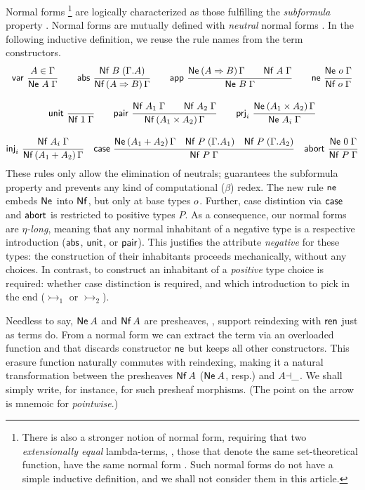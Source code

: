 \documentclass[a4paper,USenglish,cleveref, autoref]{lipics-v2019}
\begin{document}
Normal forms%
\footnote{%
There is also a stronger
notion of normal form, requiring that two \emph{extensionally equal}
lambda-terms, \ie, those that denote the
same set-theoretical function, have the same normal form
\cite{mitchell:foundations,altenkirchDybjerHofmannScott:lics01,scherer:popl17}.
Such normal forms do not have a simple inductive definition, and we
shall not consider them in this article.
}
are logically characterized as those fulfilling the
\emph{subformula} property \cite{prawitz:natded,matthes:shortproofs}.
Normal forms  are mutually defined with
\emph{neutral} normal forms .
In the following inductive definition, we reuse the rule names from the
term constructors.
\begin{gather*}
  \nru{\tvar}{A \in \Gamma}{\Ne A \Gamma}
\qquad
  \nru{\tabs}{\NfC B {\cext \Gamma A}}{\NfP {A \To B} \Gamma}
\qquad
  \nru{\tapp}
    {\NeP {A \To B} \Gamma \qquad \Nf A \Gamma}
    {\Ne B \Gamma}
\qquad
  \nru{\tne}{\Ne \tybase \Gamma}{\Nf \tybase \Gamma}
\\[2ex]
  \nru{\tunit}{}{\Nf \tyone \Gamma}
\qquad
  \nru{\tpair}
    {\Nf {A_1} \Gamma \qquad \Nf {A_2} \Gamma}
    {\NfP {A_1 \times A_2} \Gamma}
\qquad
  \nru{\tprj_i}
    {\NeP {A_1 \times A_2} \Gamma}
    {\Ne {A_i} \Gamma}
\\[2ex]
  \nru{\tinj_i}
    {\Nf {A_i} \Gamma}
    {\NfP {A_1 + A_2} \Gamma}
\quad
  \nru{\tcase}
    {\NeP {A_1 + A_2} \Gamma
      \quad \NfC P {\cext \Gamma A_1}
      \quad \NfC P {\cext \Gamma A_2}
    }{\Nf P \Gamma}
\quad
  \nru{\tabort}
    {\Ne \tyzero \Gamma}
    {\Nf P \Gamma}
\end{gather*}
These rules only allow the elimination of neutrals; guarantees
the subformula property and prevents any kind of computational
($\beta$) redex.
The new rule $\mathsf{ne}$ embeds $\mathsf{Ne}^{}$ into $\mathsf{Nf}$,
but only at base types $o$.
Further, case distintion via $\mathsf{case}$ and $\mathsf{abort}$
is restricted to positive types $P$.
As a consequence, our normal forms are
\emph{$\eta$-long}, meaning that any normal inhabitant of a negative
type is a respective introduction ($\mathsf{abs}$, $\mathsf{unit}$, or $\mathsf{pair}$).
This justifies the attribute \emph{negative} for these types:
the construction of their inhabitants proceeds mechanically, without
any choices.  In contrast, to construct an inhabitant of a
\emph{positive} type choice is required: whether case distinction is
required, and which introduction to pick in the end ($\tinj_1$ or $\tinj_2$).

Needless to say, $\mathsf{Ne}^{}\,A$ and
$\mathsf{Nf}\,A$ are presheaves, \ie, support reindexing with $\mathsf{ren}$ just as terms do.
From a normal form we can extract the term via an overloaded function
 and
that discards constructor $\mathsf{ne}$ but keeps all other constructors.
This erasure function naturally commutes with reindexing, making it a
natural transformation between the presheaves $\mathsf{Nf}\,A$ ($\mathsf{Ne}^{}\,A$,
resp.) and $A{\dashv}\_$.  We shall simply write, for instance,
 for such presheaf morphisms.
(The point on the arrow is mnemoic for \emph{pointwise}.)
\end{document}

